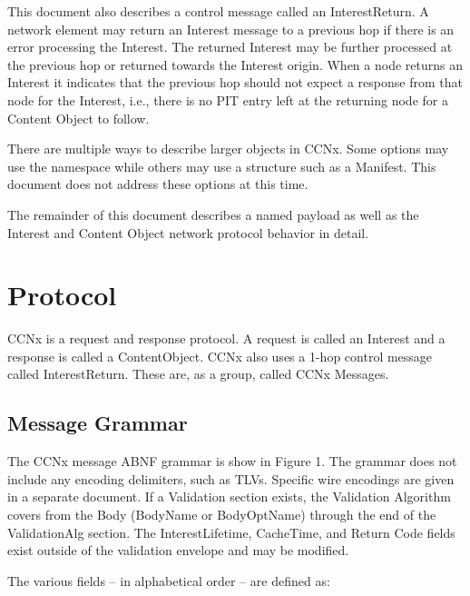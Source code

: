 \documentclass[12pt]{article}
\begin{document}
This document also describes a control message called an
InterestReturn.  A network element may return an Interest message to
a previous hop if there is an error processing the Interest.  The
returned Interest may be further processed at the previous hop or
returned towards the Interest origin.  When a node returns an
Interest it indicates that the previous hop should not expect a
response from that node for the Interest, i.e., there is no PIT entry
left at the returning node for a Content Object to follow.

There are multiple ways to describe larger objects in CCNx.  Some
options may use the namespace while others may use a structure such
as a Manifest.  This document does not address these options at this
time.

The remainder of this document describes a named payload as well as
the Interest and Content Object network protocol behavior in detail.

\section{Protocol}
CCNx is a request and response protocol.  A request is called an
Interest and a response is called a ContentObject.  CCNx also uses a
1-hop control message called InterestReturn.  These are, as a group,
called CCNx Messages.

\subsection{Message Grammar}
The CCNx message ABNF \cite{overell2008augmented} grammar is show in Figure 1.  The
grammar does not include any encoding delimiters, such as TLVs.
Specific wire encodings are given in a separate document.  If a
Validation section exists, the Validation Algorithm covers from the
Body (BodyName or BodyOptName) through the end of the ValidationAlg
section.  The InterestLifetime, CacheTime, and Return Code fields
exist outside of the validation envelope and may be modified.

The various fields -- in alphabetical order -- are defined as:
\end{document}
